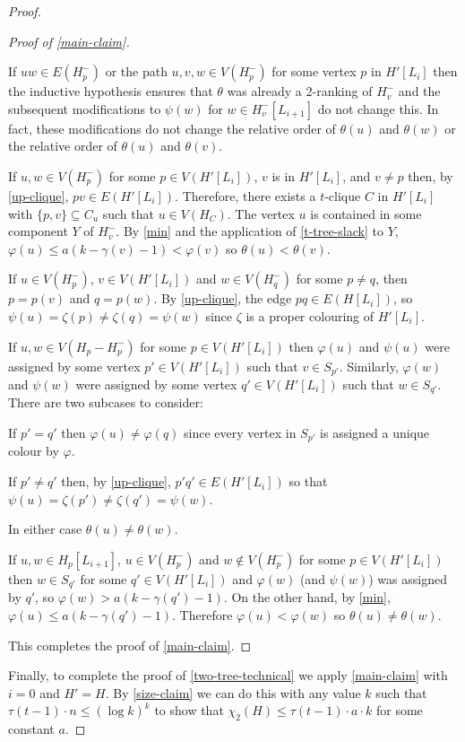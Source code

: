 \documentclass[kpfonts]{patmorin}
\newcommand{\trn}{\chi_2}
\theoremstyle{named}
\begin{document}
\begin{proof}
\begin{proof}[Proof of \cref{main-claim}]
\begin{compactenum}
          \item If $uw\in E(H^-_p)$ or the path $u,v,w\in V(H^-_p)$ for some vertex $p$ in $H'[L_i]$ then the inductive hypothesis ensures that $\theta$ was already a 2-ranking of $H^-_v$ and the subsequent modifications to $\psi(w)$ for $w\in H^-_v[L_{i+1}]$ do not change this. In fact, these modifications do not change the relative order of $\theta(u)$ and $\theta(w)$ or the relative order of $\theta(u)$ and $\theta(v)$.

          \item If $u,w\in V(H^-_p)$ for some $p\in V(H'[L_i])$, $v$ is in $H'[L_i]$, and $v\neq p$ then, by \cref{up-clique}, $pv\in E(H'[L_i])$.  Therefore, there exists a $t$-clique $C$ in $H'[L_i]$ with $\{p,v\}\subseteq C_u$ such that $u\in V(H_{C})$.  The vertex $u$ is contained in some component $Y$ of $H^-_v$. By \cref{min} and the application of \cref{t-tree-slack} to $Y$, $\varphi(u)\le a(k-\gamma(v)-1) < \varphi(v)$ so $\theta(u) < \theta(v)$.

          \item If $u\in V(H^-_{p})$, $v\in V(H'[L_i])$ and $w\in V(H^-_q)$ for some $p\neq q$, then $p=p(v)$ and $q=p(w)$.  By \cref{up-clique}, the edge $pq\in E(H[L_i])$, so $\psi(u)=\zeta(p)\neq\zeta(q)=\psi(w)$ since $\zeta$ is a proper colouring of $H'[L_i]$.

          \item If $u,w\in V(H_{p}-H^-_{p})$ for some $p\in V(H'[L_i])$ then $\varphi(u)$ and $\psi(u)$ were assigned by some vertex $p'\in V(H'[L_i])$ such that $v\in S_{p'}$.  Similarly, $\varphi(w)$ and $\psi(w)$ were assigned by some vertex $q'\in V(H'[L_i])$ such that $w\in S_{q'}$.  There are two subcases to consider:
          \begin{compactenum}
            \item If $p'=q'$ then $\varphi(u)\neq\varphi(q)$ since every vertex in $S_{p'}$ is assigned a unique colour by $\varphi$.
            \item If $p'\neq q'$ then, by \cref{up-clique}, $p'q'\in E(H'[L_i])$ so that $\psi(u)=\zeta(p')\neq\zeta(q')=\psi(w)$.
        \end{compactenum}
        In either case $\theta(u)\neq\theta(w)$.

        \item If $u,w\in H_p[L_{i+1}]$, $u\in V(H^-_{p})$ and $w\not\in V(H^-_{p})$ for some $p\in V(H'[L_i])$ then $w\in S_{q'}$ for some $q'\in V(H'[L_i])$ and $\varphi(w)$ (and $\psi(w)$) was assigned by $q'$, so $\varphi(w)>a(k-\gamma(q')-1)$. On the other hand, by \cref{min}, $\varphi(u) \le a(k-\gamma(q')-1)$.  Therefore $\varphi(u)<\varphi(w)$ so $\theta(u)\neq\theta(w)$.
      \end{compactenum}
      This completes the proof of \cref{main-claim}.
    \end{proof}
    Finally, to complete the proof of \cref{two-tree-technical} we apply \cref{main-claim} with $i=0$ and $H'=H$.  By \cref{size-claim} we can do this with any value $k$ such that $\tau(t-1)\cdot n \le (\log k)^{k}$ to show that $\trn(H)\le \tau(t-1)\cdot a\cdot k$ for some constant $a$.
\end{proof}
\end{document}
